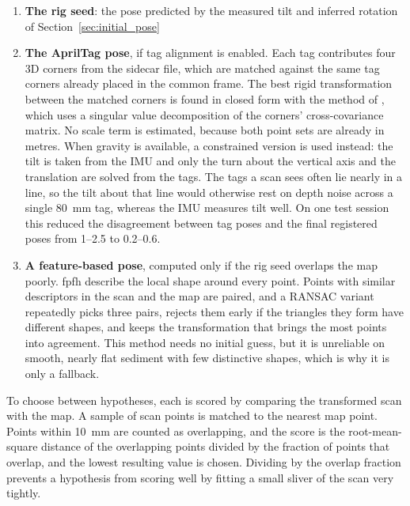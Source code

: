 \begin{enumerate}
	\item \textbf{The rig seed}: the pose predicted by the measured tilt and inferred rotation of Section~\ref{sec:initial_pose}
	
	\item \textbf{The AprilTag pose}, if tag alignment is enabled. Each tag contributes four 3D corners from the sidecar file, which are matched against the same tag corners already placed in the common frame. The best rigid transformation between the matched corners is found in closed form with the method of \citet{umeyamaLeastsquaresEstimationTransformation1991}, which uses a singular value decomposition of the corners' cross-covariance matrix. No scale term is estimated, because both point sets are already in metres. When gravity is available, a constrained version is used instead: the tilt is taken from the IMU and only the turn about the vertical axis and the translation are solved from the tags. The tags a scan sees often lie nearly in a line, so the tilt about that line would otherwise rest on depth noise across a single 80~mm tag, whereas the IMU measures tilt well. On one test session this reduced the disagreement between tag poses and the final registered poses from 1--2.5\degree{} to 0.2--0.6\degree{}.
	
	\item \textbf{A feature-based pose}, computed only if the rig seed overlaps the map poorly. \gls{fpfh} describe the local shape around every point. Points with similar descriptors in the scan and the map are paired, and a RANSAC variant repeatedly picks three pairs, rejects them early if the triangles they form have different shapes, and keeps the transformation that brings the most points into agreement. This method needs no initial guess, but it is unreliable on smooth, nearly flat sediment with few distinctive shapes, which is why
	it is only a fallback.
\end{enumerate}

To choose between hypotheses, each is scored by comparing the transformed scan with the map. A sample of scan points is matched to the nearest map point. Points within 10~mm are counted as overlapping, and the score is the root-mean-square distance of the overlapping points divided by the fraction of points that overlap, and the lowest resulting value is chosen. Dividing by the overlap fraction prevents a hypothesis from scoring well by fitting a small sliver of the scan very tightly.

